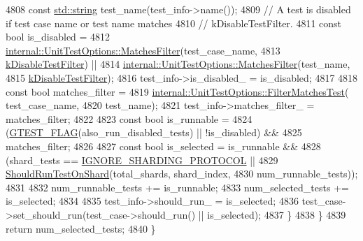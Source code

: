 \begin{DoxyCode}
4808       \textcolor{keyword}{const} \hyperlink{namespacetesting_1_1internal_a8e8ff5b11e64078831112677156cb111}{std::string} test\_name(test\_info->name());
4809       \textcolor{comment}{// A test is disabled if test case name or test name matches}
4810       \textcolor{comment}{// kDisableTestFilter.}
4811       \textcolor{keyword}{const} \textcolor{keywordtype}{bool} is\_disabled =
4812           \hyperlink{classtesting_1_1internal_1_1UnitTestOptions_a67fc0adaffbb8d320b92e42e05017e4e}{internal::UnitTestOptions::MatchesFilter}(test\_case\_name,
4813                                                    \hyperlink{namespacetesting_a0a2a3239fb038e7ce83195d89941872d}{kDisableTestFilter}) ||
4814           \hyperlink{classtesting_1_1internal_1_1UnitTestOptions_a67fc0adaffbb8d320b92e42e05017e4e}{internal::UnitTestOptions::MatchesFilter}(test\_name,
4815                                                    \hyperlink{namespacetesting_a0a2a3239fb038e7ce83195d89941872d}{kDisableTestFilter});
4816       test\_info->is\_disabled\_ = is\_disabled;
4817 
4818       \textcolor{keyword}{const} \textcolor{keywordtype}{bool} matches\_filter =
4819           \hyperlink{classtesting_1_1internal_1_1UnitTestOptions_a9975b59cece94874b303421697e3bca6}{internal::UnitTestOptions::FilterMatchesTest}(
      test\_case\_name,
4820                                                        test\_name);
4821       test\_info->matches\_filter\_ = matches\_filter;
4822 
4823       \textcolor{keyword}{const} \textcolor{keywordtype}{bool} is\_runnable =
4824           (\hyperlink{gtest-port_8h_a828f4e34a1c4b510da50ec1563e3562a}{GTEST\_FLAG}(also\_run\_disabled\_tests) || !is\_disabled) &&
4825           matches\_filter;
4826 
4827       \textcolor{keyword}{const} \textcolor{keywordtype}{bool} is\_selected = is\_runnable &&
4828           (shard\_tests == \hyperlink{classtesting_1_1internal_1_1UnitTestImpl_acc5ffd3f9bc2e87bb3dba4218f58af43a68bd0b7e6a7bead14c93d1a42144095a}{IGNORE\_SHARDING\_PROTOCOL} ||
4829            \hyperlink{namespacetesting_1_1internal_a437bd89f5bc532778d7467600e210395}{ShouldRunTestOnShard}(total\_shards, shard\_index,
4830                                 num\_runnable\_tests));
4831 
4832       num\_runnable\_tests += is\_runnable;
4833       num\_selected\_tests += is\_selected;
4834 
4835       test\_info->should\_run\_ = is\_selected;
4836       test\_case->set\_should\_run(test\_case->should\_run() || is\_selected);
4837     \}
4838   \}
4839   \textcolor{keywordflow}{return} num\_selected\_tests;
4840 \}
\end{DoxyCode}

